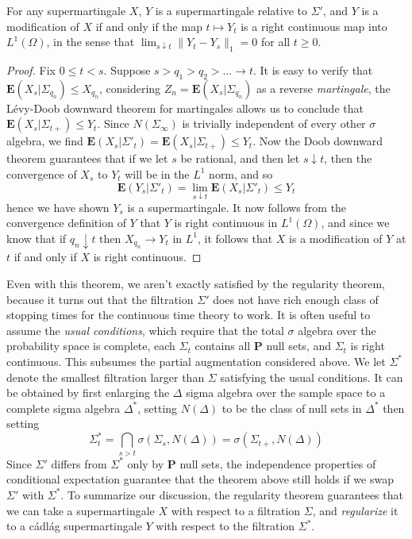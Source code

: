\begin{theorem}
    For any supermartingale $X$, $Y$ is a supermartingale relative to $\Sigma'$, and $Y$ is a modification of $X$ if and only if the map $t \mapsto Y_t$ is a right continuous map into $L^1(\Omega)$, in the sense that $\lim_{s \downarrow t} \| Y_t - Y_s \|_1 = 0$ for all $t \geq 0$.
\end{theorem}
\begin{proof}
    Fix $0 \leq t < s$. Suppose $s > q_1 > q_2 > \dots \to t$. It is easy to verify that $\mathbf{E}(X_s|\Sigma_{q_n}) \leq X_{q_n}$, considering $Z_n = \mathbf{E}(X_s|\Sigma_{q_n})$ as a reverse {\it martingale}, the L\'{e}vy-Doob downward theorem for martingales allows us to conclude that $\mathbf{E}(X_s|\Sigma_{t+}) \leq Y_t$. Since $N(\Sigma_\infty)$ is trivially independent of every other $\sigma$ algebra, we find $\mathbf{E}(X_s|\Sigma'_t) = \mathbf{E}(X_s|\Sigma_{t+}) \leq Y_t$. Now the Doob downward theorem guarantees that if we let $s$ be rational, and then let $s \downarrow t$, then the convergence of $X_s$ to $Y_t$ will be in the $L^1$ norm, and so
    \[ \mathbf{E}(Y_s|\Sigma'_t) = \lim_{s \downarrow t} \mathbf{E}(X_s|\Sigma'_t) \leq Y_t \]
    hence we have shown $Y_s$ is a supermartingale. It now follows from the convergence definition of $Y$ that $Y$ is right continuous in $L^1(\Omega)$, and since we know that if $q_n \downarrow t$ then $X_{q_n} \to Y_t$ in $L^1$, it follows that $X$ is a modification of $Y$ at $t$ if and only if $X$ is right continuous.
\end{proof}

Even with this theorem, we aren't exactly satisfied by the regularity theorem, because it turns out that the filtration $\Sigma'$ does not have rich enough class of stopping times for the continuous time theory to work. It is often useful to assume the {\it usual conditions}, which require that the total $\sigma$ algebra over the probability space is complete, each $\Sigma_t$ contains all $\mathbf{P}$ null sets, and $\Sigma_t$ is right continuous. This subsumes the partial augmentation considered above. We let $\Sigma^*$ denote the smallest filtration larger than $\Sigma$ satisfying the usual conditions. It can be obtained by first enlarging the $\Delta$ sigma algebra over the sample space to a complete sigma algebra $\Delta^*$, setting $N(\Delta)$ to be the class of null sets in $\Delta^*$ then setting
%
\[ \Sigma^*_t = \bigcap_{s > t} \sigma(\Sigma_s, N(\Delta)) = \sigma(\Sigma_{t+}, N(\Delta)) \]
%
Since $\Sigma'$ differs from $\Sigma^*$ only by $\mathbf{P}$ null sets, the independence properties of conditional expectation guarantee that the theorem above still holds if we swap $\Sigma'$ with $\Sigma^*$. To summarize our discussion, the regularity theorem guarantees that we can take a supermartingale $X$ with respect to a filtration $\Sigma$, and {\it regularize} it to a c\'{a}dl\'{a}g supermartingale $Y$ with respect to the filtration $\Sigma^*$.

